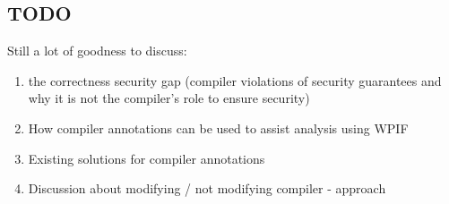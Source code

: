 \documentclass[twocolumn]{article}
\begin{document}
\subsection{}

\subsection{TODO}
Still a lot of goodness to discuss:
\begin{enumerate}
    \item the correctness security gap (compiler violations of security guarantees and why it is not the compiler's role to ensure security)
    \item How compiler annotations can be used to assist analysis using WPIF
    \item Existing solutions for compiler annotations
    \item Discussion about modifying / not modifying compiler - approach
\end{enumerate}






\printbibliography
\end{document}
